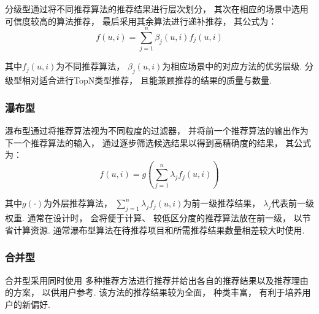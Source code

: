 分级型通过将不同推荐算法的推荐结果进行层次划分，
其次在相应的场景中选用可信度较高的算法推荐，
最后采用其余算法进行递补推荐，
其公式为：
\begin{equation}
    f(u,i)=\sum_{j=1}^n\beta_j(u,i)f_j(u,i)
\end{equation}

其中$f_j(u,i)$为不同推荐算法，
$\beta_j(u,i)$为相应场景中的对应方法的优劣层级.
分级型相对适合进行TopN类型推荐，
且能兼顾推荐的结果的质量与数量.

\subsubsection{瀑布型}

瀑布型通过将推荐算法视为不同粒度的过滤器，
并将前一个推荐算法的输出作为下一个推荐算法的输入，
通过逐步筛选候选结果以得到高精确度的结果，
其公式为：
\begin{equation}
    f(u,i)=g\left(\sum_{j=1}^n\lambda_j f_j(u,i)\right)
\end{equation}

其中$g(\cdot)$为外层推荐算法，
$\sum_{j=1}^n\lambda_j f_j(u,i)$为前一级推荐结果，
$\lambda_j$代表前一级权重.
通常在设计时，
会将便于计算、
较低区分度的推荐算法放在前一级，
以节省计算资源.
通常瀑布型算法在待推荐项目和所需推荐结果数量相差较大时使用.

\subsubsection{合并型}

合并型采用同时使用
多种推荐方法进行推荐并给出各自的推荐结果以及推荐理由
的方案，
以供用户参考.
该方法的推荐结果较为全面，
种类丰富，
有利于培养用户的新偏好.
